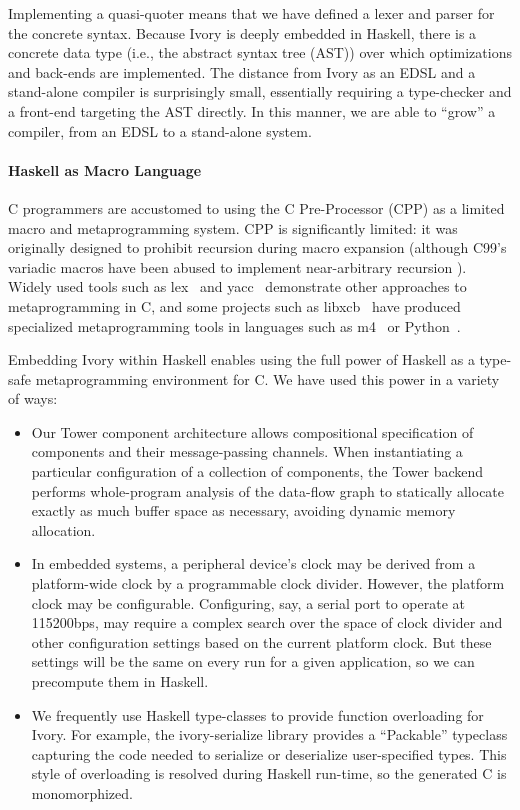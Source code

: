 Implementing a quasi-quoter means that we have defined a lexer and parser for
the concrete syntax. Because Ivory is deeply embedded in Haskell, there is a
concrete data type (i.e., the abstract syntax tree (AST)) over which
optimizations and back-ends are implemented. The distance from Ivory as an EDSL
and a stand-alone compiler is surprisingly small, essentially requiring a
type-checker and a front-end targeting the AST directly. In this manner, we are
able to ``grow'' a compiler, from an EDSL to a stand-alone system.

\paragraph{Haskell as Macro Language}
C programmers are accustomed to using the C Pre-Processor (CPP) as a limited
macro and metaprogramming system. CPP is significantly limited: it was
originally designed to prohibit recursion during macro expansion (although C99's
variadic macros have been abused to implement near-arbitrary recursion
).
Widely used tools such as lex~\cite{} and yacc~\cite{} demonstrate other
approaches to metaprogramming in C, and some projects such as libxcb~\cite{}
have produced specialized metaprogramming tools in languages such as m4~\cite{}
or Python~\cite{}.

Embedding Ivory within Haskell enables using the full power of Haskell as a
type-safe metaprogramming environment for C. We have used this power in a
variety of ways:

\begin{itemize}
\item Our Tower component architecture allows compositional specification of
  components and their message-passing channels. When instantiating a particular
  configuration of a collection of components, the Tower backend performs
  whole-program analysis of the data-flow graph to statically allocate exactly
  as much buffer space as necessary, avoiding dynamic memory allocation.
\item In embedded systems, a peripheral device's clock may be derived from a
  platform-wide clock by a programmable clock divider. However, the platform
  clock may be configurable. Configuring, say, a serial port to operate at
  115200bps, may require a complex search over the space of clock divider and
  other configuration settings based on the current platform clock. But these
  settings will be the same on every run for a given application, so we can
  precompute them in Haskell.
\item We frequently use Haskell type-classes to provide function overloading for
  Ivory. For example, the ivory-serialize library provides a ``Packable''
  typeclass capturing the code needed to serialize or deserialize user-specified
  types. This style of overloading is resolved during Haskell run-time, so the
  generated C is monomorphized.
\end{itemize}

